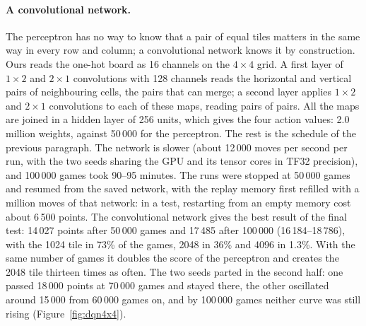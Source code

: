 \documentclass[11pt,a4paper]{article}
\theoremstyle{remark}
\begin{document}
\paragraph{A convolutional network.} The perceptron has no way to know that a pair of equal tiles matters in the same way in every row and column; a convolutional network knows it by construction. Ours reads the one-hot board as 16 channels on the $4\times4$ grid. A first layer of $1\times2$ and $2\times1$ convolutions with 128 channels reads the horizontal and vertical pairs of neighbouring cells, the pairs that can merge; a second layer applies $1\times2$ and $2\times1$ convolutions to each of these maps, reading pairs of pairs. All the maps are joined in a hidden layer of 256 units, which gives the four action values: 2.0 million weights, against 50\,000 for the perceptron. The rest is the schedule of the previous paragraph. The network is slower (about 12\,000 moves per second per run, with the two seeds sharing the GPU and its tensor cores in TF32 precision), and 100\,000 games took 90--95 minutes. The runs were stopped at 50\,000 games and resumed from the saved network, with the replay memory first refilled with a million moves of that network: in a test, restarting from an empty memory cost about 6\,500 points. The convolutional network gives the best result of the final test: 14\,027 points after 50\,000 games and 17\,485 after 100\,000 (16\,184--18\,786), with the 1024 tile in 73\% of the games, 2048 in 36\% and 4096 in 1.3\%. With the same number of games it doubles the score of the perceptron and creates the 2048 tile thirteen times as often. The two seeds parted in the second half: one passed 18\,000 points at 70\,000 games and stayed there, the other oscillated around 15\,000 from 60\,000 games on, and by 100\,000 games neither curve was still rising (Figure~\ref{fig:dqn4x4}).
\end{document}
